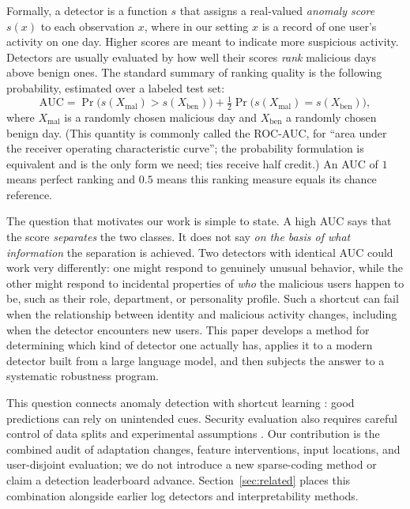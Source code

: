 \documentclass[10pt]{article} %
\begin{document}
Formally, a detector is a function $s$ that assigns a real-valued
\emph{anomaly score} $s(x)$ to each observation $x$, where in our
setting $x$ is a record of one user's activity on one day. Higher
scores are meant to indicate more suspicious activity. Detectors are
usually evaluated by how well their scores \emph{rank} malicious days
above benign ones. The standard summary of ranking quality is the
following probability, estimated over a labeled test set:
\begin{equation}
\mathrm{AUC} = \Pr\bigl(s(X_{\mathrm{mal}})>s(X_{\mathrm{ben}})\bigr)
+ \tfrac12\Pr\bigl(s(X_{\mathrm{mal}})=s(X_{\mathrm{ben}})\bigr),
\label{eq:auc}
\end{equation}
where $X_{\mathrm{mal}}$ is a randomly chosen malicious day and
$X_{\mathrm{ben}}$ a randomly chosen benign day. (This quantity is
commonly called the ROC-AUC, for ``area under the receiver operating
characteristic curve''; the probability formulation is equivalent and is
the only form we need; ties receive half credit.) An AUC of $1$ means perfect ranking and $0.5$
means this ranking measure equals its chance reference.

The question that motivates our work is simple to state. A high AUC
says that the score \emph{separates} the two classes. It does not say
\emph{on the basis of what information} the separation is achieved. Two
detectors with identical AUC could work very differently: one might
respond to genuinely unusual behavior, while the other might respond to
incidental properties of \emph{who} the malicious users happen to be,
such as their role, department, or personality profile. Such a shortcut can fail when the relationship between identity and
malicious activity changes, including when the detector encounters new users. This paper develops a
method for determining which kind of detector one actually has, applies
it to a modern detector built from a large language model, and then
subjects the answer to a systematic robustness program.

This question connects anomaly detection \citep{chandola2009anomaly}
with shortcut learning \citep{geirhos2020shortcut,lapuschkin2019unmasking}:
good predictions can rely on unintended cues. Security evaluation also
requires careful control of data splits and experimental assumptions
\citep{arp2022dos,landauer2024critical}. Our contribution is the combined
audit of adaptation changes, feature interventions, input locations, and
user-disjoint evaluation; we do not introduce a new sparse-coding method
or claim a detection leaderboard advance. Section~\ref{sec:related}
places this combination alongside earlier log detectors and interpretability
methods.
\end{document}
